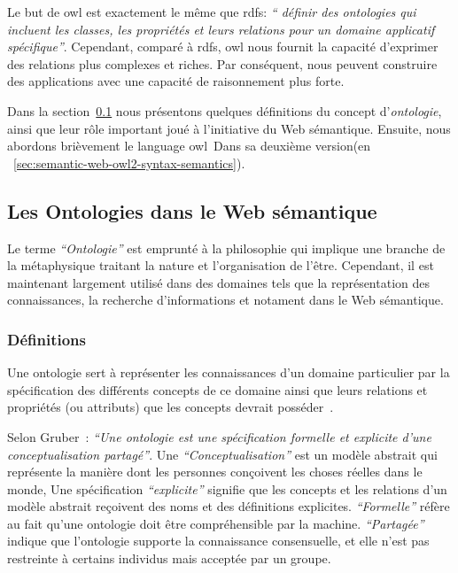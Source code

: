 Le but de \acrshort{owl} est exactement le même que \acrshort{rdfs}:
\emph{`` définir des ontologies qui incluent les classes, les
  propriétés et leurs relations pour un domaine applicatif
  spécifique''}. Cependant, comparé à \acrshort{rdfs}, \acrshort{owl}
nous fournit la capacité d'exprimer des relations plus complexes et
riches. Par conséquent, nous peuvent construire des applications avec
une capacité de raisonnement plus forte.\medskip

Dans la section~\ref{sec:semantic-web-owl2-ontolgies} nous présentons
quelques définitions du concept d'\emph{ontologie}, ainsi que leur
rôle important joué à l'initiative du Web sémantique. Ensuite, nous
abordons brièvement le language \acrshort{owl}~\cite{w3c2009owl}Dans
sa deuxième version(en ~\ref{sec:semantic-web-owl2-syntax-semantics}).

\subsection{Les Ontologies dans le Web sémantique}
\label{sec:semantic-web-owl2-ontolgies}

Le terme \emph{``Ontologie''} est emprunté à la philosophie qui
implique une branche de la métaphysique traitant la nature et
l’organisation de l'être. Cependant, il est maintenant largement
utilisé dans des domaines tels que la représentation des
connaissances, la recherche d'informations et notament dans le Web
sémantique.

\subsubsection{Définitions}
\label{sec:semantic-web-owl2-defs}

Une ontologie sert à représenter les connaissances d'un domaine
particulier par la spécification des différents concepts de ce domaine
ainsi que leurs relations et propriétés (ou attributs) que les
concepts devrait posséder~\cite{mcguinness2004owl}.\medskip

Selon Gruber~\cite{gruber1993translation}: \emph{``Une ontologie est
  une spécification formelle et explicite d'une conceptualisation
  partagé''}. Une \emph{``Conceptualisation''} est un modèle abstrait
qui représente la manière dont les personnes conçoivent les choses
réelles dans le monde, Une spécification \emph{``explicite''} signifie
que les concepts et les relations d'un modèle abstrait reçoivent des
noms et des définitions explicites. \emph{``Formelle''} réfère au fait
qu'une ontologie doit être compréhensible par la
machine. \emph{``Partagée''} indique que l'ontologie supporte la
connaissance consensuelle, et elle n'est pas restreinte à certains
individus mais acceptée par un groupe.\medskip

